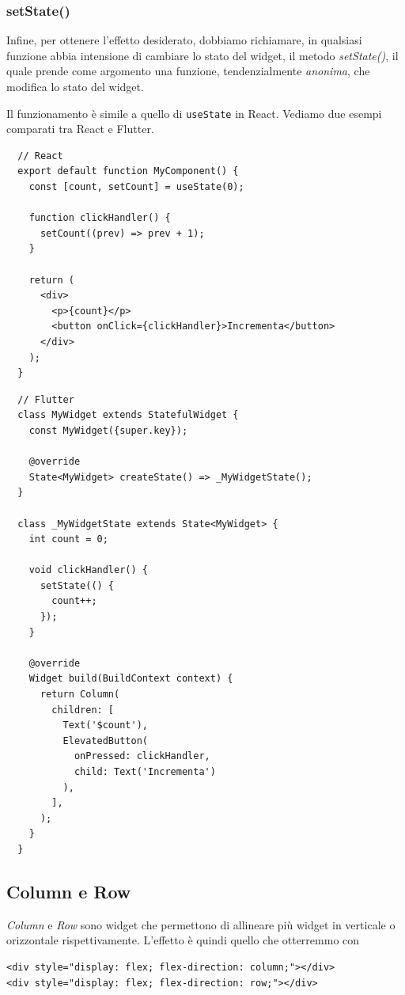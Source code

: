 \documentclass[12pt]{article}
\begin{document}
\subsubsection{setState()}
Infine, per ottenere l'effetto desiderato, dobbiamo richiamare,
in qualsiasi funzione abbia intensione di cambiare lo stato del widget,
il metodo \textit{setState()}, il quale prende come argomento una
funzione, tendenzialmente \textit{anonima}, che modifica lo stato del widget.

Il funzionamento è simile a quello di \texttt{useState} in React.
Vediamo due esempi comparati tra React e Flutter.

\begin{highlight}
\begin{verbatim}
  // React
  export default function MyComponent() {
    const [count, setCount] = useState(0);

    function clickHandler() {
      setCount((prev) => prev + 1);
    }

    return (
      <div>
        <p>{count}</p>
        <button onClick={clickHandler}>Incrementa</button>
      </div>
    );
  }
\end{verbatim}
\end{highlight}

\begin{highlight}
\begin{verbatim}
  // Flutter
  class MyWidget extends StatefulWidget {
    const MyWidget({super.key});

    @override
    State<MyWidget> createState() => _MyWidgetState();
  }

  class _MyWidgetState extends State<MyWidget> {
    int count = 0;

    void clickHandler() {
      setState(() {
        count++;
      });
    }

    @override
    Widget build(BuildContext context) {
      return Column(
        children: [
          Text('$count'),
          ElevatedButton(
            onPressed: clickHandler,
            child: Text('Incrementa')
          ),
        ],
      );
    }
  }
\end{verbatim}
\end{highlight}










\subsection{Column e Row}
\textit{Column} e \textit{Row} sono widget che permettono di allineare
più widget in verticale o orizzontale rispettivamente.
L'effetto è quindi quello che otterremmo con
\begin{verbatim}
<div style="display: flex; flex-direction: column;"></div>
<div style="display: flex; flex-direction: row;"></div>
\end{verbatim}
\end{document}
